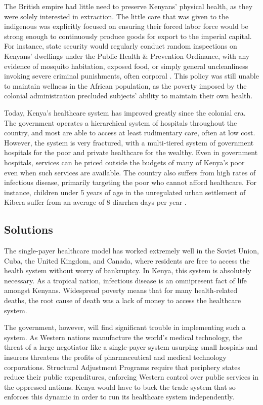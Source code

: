 \documentclass{../../../coursework}
\begin{document}
The British empire had little need to preserve Kenyans' physical health, as
they were solely interested in extraction. The little care that was given to
the indigenous was explicitly focused on ensuring their forced labor force
would be strong enough to continuously produce goods for export to the
imperial capital. For instance, state security would regularly conduct random
inspections on Kenyans' dwellings under the Public Health \& Prevention
Ordinance, with any evidence of mosquito habitation, exposed food, or simply
general uncleanliness invoking severe criminal punishments, often corporal
\parencite{Achola2010}. This policy was still unable to maintain wellness in
the African population, as the poverty imposed by the colonial administration
precluded subjects' ability to maintain their own health.

Today, Kenya's healthcare system has improved greatly since the colonial era.
The government operates a hierarchical system of hospitals throughout the
country, and most are able to access at least rudimentary care, often at low
cost. However, the system is very fractured, with a multi-tiered system of
government hospitals for the poor and private healthcare for the wealthy. Even
in government hospitals, services can be priced outside the budgets of many of
Kenya's poor even when such services are available. The country also suffers
from high rates of infectious disease, primarily targeting the poor who cannot
afford healthcare. For instance, children under 5 years of age in the
unregulated urban settlement of Kibera suffer from an average of 8 diarrhea
days per year \parencite{Feikin2011}.

\subsection{Solutions}

The single-payer healthcare model has worked extremely well in the Soviet
Union, Cuba, the United Kingdom, and Canada, where residents are free to
access the health system without worry of bankruptcy. In Kenya, this system is
absolutely necessary. As a tropical nation, infectious disease is an
omnipresent fact of life amongst Kenyans. Widespread poverty means that for
many health-related deaths, the root cause of death was a lack of money to
access the healthcare system.

The government, however, will find significant trouble in implementing such a
system. As Western nations manufacture the world's medical technology, the
threat of a large negotiator like a single-payer system usurping small
hospials and insurers threatens the profits of pharmaceutical and medical
technology corporations. Structural Adjustment Programs require that periphery
states reduce their public expenditures, enforcing Western control over public
services in the oppressed nations. Kenya would have to buck the trade system
that so enforces this dynamic in order to run its healthcare system
independently.
\end{document}
